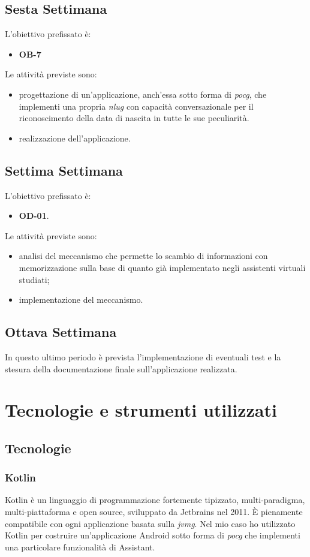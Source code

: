 	\subsection*{Sesta Settimana}
	L'obiettivo prefissato è:
	\begin{itemize}
		\item \textbf{OB-7}
	\end{itemize}
	Le attività previste sono:
	\begin{itemize}
		\item progettazione di un'applicazione, anch'essa sotto forma di \emph{\gls{pocg}}, che implementi una propria \emph{\gls{nlug}} con capacità conversazionale per il riconoscimento della data di nascita in tutte le sue peculiarità.
		\item realizzazione dell'applicazione.
	\end{itemize}
	\subsection*{Settima Settimana}
	L'obiettivo prefissato è:
	\begin{itemize}
		\item \textbf{OD-01}.
	\end{itemize}
	Le attività previste sono:
	\begin{itemize}
		\item analisi del meccanismo che permette lo scambio di informazioni con memorizzazione sulla base di quanto già implementato negli assistenti virtuali studiati;
		\item implementazione del meccanismo.
	\end{itemize}
	\subsection*{Ottava Settimana}
	In questo ultimo periodo è prevista l'implementazione di eventuali test e la stesura della documentazione finale sull'applicazione realizzata.

\section{Tecnologie e strumenti utilizzati}
	\subsection{Tecnologie}
		\subsubsection{Kotlin}
		Kotlin è un linguaggio di programmazione fortemente tipizzato, multi-paradigma, multi-piattaforma e open source, sviluppato da Jetbrains nel 2011. È pienamente compatibile con ogni applicazione basata sulla \emph{\gls{jvmg}}\glsfirstoccur. Nel mio caso ho utilizzato Kotlin per costruire un'applicazione Android sotto forma di \emph{\gls{pocg}} che implementi una particolare funzionalità di Assistant.
